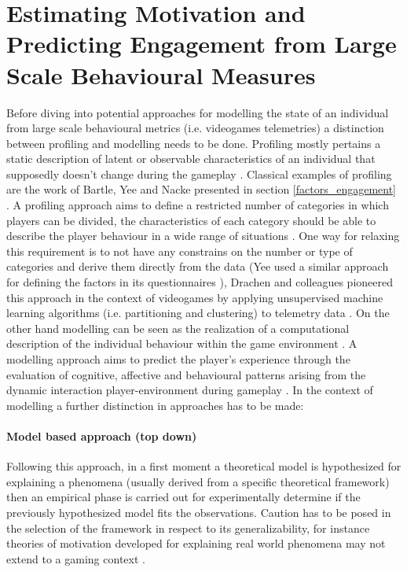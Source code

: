 \section{Estimating Motivation and Predicting Engagement from Large Scale Behavioural Measures}
\label{estpred_motivation_engagement}
Before diving into potential approaches for modelling the state of an individual from large scale behavioural metrics (i.e. videogames telemetries) a distinction between profiling and modelling needs to be done. Profiling mostly pertains a static description of latent or observable characteristics of an individual that supposedly doesn’t change during the gameplay \cite{yannakakis2013player}. Classical examples of profiling are the work of Bartle, Yee and Nacke presented in section \ref{factors_engagement} \cite{bartle1996hearts, yee2006motivations, nacke2011brainhex}. A profiling approach aims to define a restricted number of categories in which players can be divided, the characteristics of each category should be able to describe the player behaviour in a wide range of situations \cite{yannakakis2013player, van2009psychologically, van2011games}. One way for relaxing this requirement is to not have any constrains on the number or type of categories and derive them directly from the data (Yee used a similar approach for defining the factors in its questionnaires \cite{yee2006motivations}), Drachen and colleagues pioneered this approach in the context of videogames by applying unsupervised machine learning algorithms (i.e. partitioning and clustering) to telemetry data \cite{tychsen2008defining,drachen2009player, drachen2012guns}. On the other hand modelling can be seen as the realization of a computational description of the individual behaviour within the game environment \cite{yannakakis2013player}. A modelling approach aims to predict the player’s experience through the evaluation of cognitive, affective and behavioural patterns arising from the dynamic interaction player-environment during gameplay \cite{yannakakis2013player}. In the context of modelling a further distinction in approaches has to be made:

\paragraph*{Model based approach (top down)} Following this approach, in a first moment a theoretical model is hypothesized for explaining a phenomena (usually derived from a specific theoretical framework) then an empirical phase is carried out for experimentally determine if the previously hypothesized model fits the observations. Caution has to be posed in the selection of the framework in respect to its generalizability, for instance theories of motivation developed for explaining real world phenomena may not extend to a gaming context \cite{yannakakis2013player}.

